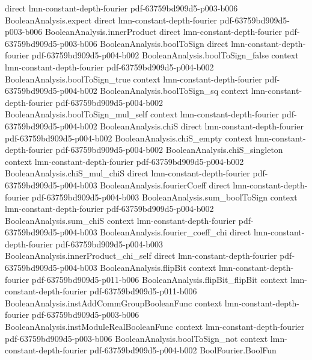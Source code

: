 \begin{lemma}
  {direct}
  {lmn-constant-depth-fourier}
  {pdf-63759bd909d5-p003-b006}
\proofstep
  {BooleanAnalysis.expect}
  {direct}
  {lmn-constant-depth-fourier}
  {pdf-63759bd909d5-p003-b006}
\proofstep
  {BooleanAnalysis.innerProduct}
  {direct}
  {lmn-constant-depth-fourier}
  {pdf-63759bd909d5-p003-b006}
\proofstep
  {BooleanAnalysis.boolToSign}
  {direct}
  {lmn-constant-depth-fourier}
  {pdf-63759bd909d5-p004-b002}
\proofstep
  {BooleanAnalysis.boolToSign_false}
  {context}
  {lmn-constant-depth-fourier}
  {pdf-63759bd909d5-p004-b002}
\proofstep
  {BooleanAnalysis.boolToSign_true}
  {context}
  {lmn-constant-depth-fourier}
  {pdf-63759bd909d5-p004-b002}
\proofstep
  {BooleanAnalysis.boolToSign_sq}
  {context}
  {lmn-constant-depth-fourier}
  {pdf-63759bd909d5-p004-b002}
\proofstep
  {BooleanAnalysis.boolToSign_mul_self}
  {context}
  {lmn-constant-depth-fourier}
  {pdf-63759bd909d5-p004-b002}
\proofstep
  {BooleanAnalysis.chiS}
  {direct}
  {lmn-constant-depth-fourier}
  {pdf-63759bd909d5-p004-b002}
\proofstep
  {BooleanAnalysis.chiS_empty}
  {context}
  {lmn-constant-depth-fourier}
  {pdf-63759bd909d5-p004-b002}
\proofstep
  {BooleanAnalysis.chiS_singleton}
  {context}
  {lmn-constant-depth-fourier}
  {pdf-63759bd909d5-p004-b002}
\proofstep
  {BooleanAnalysis.chiS_mul_chiS}
  {direct}
  {lmn-constant-depth-fourier}
  {pdf-63759bd909d5-p004-b003}
\proofstep
  {BooleanAnalysis.fourierCoeff}
  {direct}
  {lmn-constant-depth-fourier}
  {pdf-63759bd909d5-p004-b003}
\proofstep
  {BooleanAnalysis.sum_boolToSign}
  {context}
  {lmn-constant-depth-fourier}
  {pdf-63759bd909d5-p004-b002}
\proofstep
  {BooleanAnalysis.sum_chiS}
  {context}
  {lmn-constant-depth-fourier}
  {pdf-63759bd909d5-p004-b003}
\proofstep
  {BooleanAnalysis.fourier_coeff_chi}
  {direct}
  {lmn-constant-depth-fourier}
  {pdf-63759bd909d5-p004-b003}
\proofstep
  {BooleanAnalysis.innerProduct_chi_self}
  {direct}
  {lmn-constant-depth-fourier}
  {pdf-63759bd909d5-p004-b003}
\proofstep
  {BooleanAnalysis.flipBit}
  {context}
  {lmn-constant-depth-fourier}
  {pdf-63759bd909d5-p011-b006}
\proofstep
  {BooleanAnalysis.flipBit_flipBit}
  {context}
  {lmn-constant-depth-fourier}
  {pdf-63759bd909d5-p011-b006}
\proofstep
  {BooleanAnalysis.instAddCommGroupBooleanFunc}
  {context}
  {lmn-constant-depth-fourier}
  {pdf-63759bd909d5-p003-b006}
\proofstep
  {BooleanAnalysis.instModuleRealBooleanFunc}
  {context}
  {lmn-constant-depth-fourier}
  {pdf-63759bd909d5-p003-b006}
\proofstep
  {BooleanAnalysis.boolToSign_not}
  {context}
  {lmn-constant-depth-fourier}
  {pdf-63759bd909d5-p004-b002}
\proofstep
  {BoolFourier.BoolFun}

\end{lemma}
